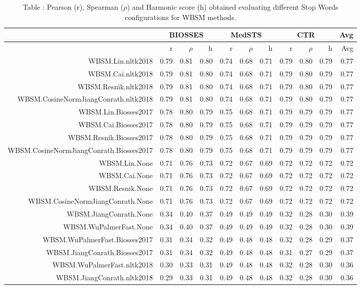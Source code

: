 \begin{table}[!h]
\centering
\caption{Table \label{table:Preprocessing_stopwords_WBSM}: Pearson (r), Spearman ($\rho$) and Harmonic score (h) obtained evaluating different Stop Words configurations for WBSM methods.} 
\begingroup\tiny
\begin{tabular}{rrrrrrrrrrr}
  \hline \multicolumn{1}{c}{ } & \multicolumn{3}{c}{BIOSSES} & \multicolumn{3}{c}{MedSTS} & \multicolumn{3}{c}{CTR} & \multicolumn{1}{c}{Avg} \\  \hline
 & r & $\rho$ & h & r & $\rho$ & h & r & $\rho$ & h & Avg \\ 
  \hline
WBSM.Lin.nltk2018 & 0.79 & 0.81 & 0.80 & 0.74 & 0.68 & 0.71 & 0.79 & 0.80 & 0.79 & 0.77 \\ 
  WBSM.Cai.nltk2018 & 0.79 & 0.81 & 0.80 & 0.74 & 0.68 & 0.71 & 0.79 & 0.80 & 0.79 & 0.77 \\ 
  WBSM.Resnik.nltk2018 & 0.79 & 0.81 & 0.80 & 0.74 & 0.68 & 0.71 & 0.79 & 0.80 & 0.79 & 0.77 \\ 
  WBSM.CosineNormJiangConrath.nltk2018 & 0.79 & 0.81 & 0.80 & 0.74 & 0.68 & 0.71 & 0.79 & 0.80 & 0.79 & 0.77 \\ 
  WBSM.Lin.Biosses2017 & 0.78 & 0.80 & 0.79 & 0.75 & 0.68 & 0.71 & 0.79 & 0.79 & 0.79 & 0.77 \\ 
  WBSM.Cai.Biosses2017 & 0.78 & 0.80 & 0.79 & 0.75 & 0.68 & 0.71 & 0.79 & 0.79 & 0.79 & 0.77 \\ 
  WBSM.Resnik.Biosses2017 & 0.78 & 0.80 & 0.79 & 0.75 & 0.68 & 0.71 & 0.79 & 0.79 & 0.79 & 0.77 \\ 
  WBSM.CosineNormJiangConrath.Biosses2017 & 0.78 & 0.80 & 0.79 & 0.75 & 0.68 & 0.71 & 0.79 & 0.79 & 0.79 & 0.77 \\ 
  WBSM.Lin.None & 0.71 & 0.76 & 0.73 & 0.72 & 0.67 & 0.69 & 0.72 & 0.72 & 0.72 & 0.72 \\ 
  WBSM.Cai.None & 0.71 & 0.76 & 0.73 & 0.72 & 0.67 & 0.69 & 0.72 & 0.72 & 0.72 & 0.72 \\ 
  WBSM.Resnik.None & 0.71 & 0.76 & 0.73 & 0.72 & 0.67 & 0.69 & 0.72 & 0.72 & 0.72 & 0.72 \\ 
  WBSM.CosineNormJiangConrath.None & 0.71 & 0.76 & 0.73 & 0.72 & 0.67 & 0.69 & 0.72 & 0.72 & 0.72 & 0.72 \\ 
  WBSM.JiangConrath.None & 0.34 & 0.40 & 0.37 & 0.49 & 0.49 & 0.49 & 0.32 & 0.28 & 0.30 & 0.39 \\ 
  WBSM.WuPalmerFast.None & 0.34 & 0.40 & 0.37 & 0.49 & 0.49 & 0.49 & 0.32 & 0.28 & 0.30 & 0.39 \\ 
  WBSM.WuPalmerFast.Biosses2017 & 0.31 & 0.34 & 0.32 & 0.49 & 0.48 & 0.48 & 0.32 & 0.28 & 0.29 & 0.37 \\ 
  WBSM.JiangConrath.Biosses2017 & 0.31 & 0.34 & 0.32 & 0.49 & 0.48 & 0.48 & 0.31 & 0.27 & 0.29 & 0.37 \\ 
  WBSM.WuPalmerFast.nltk2018 & 0.30 & 0.33 & 0.31 & 0.49 & 0.48 & 0.48 & 0.32 & 0.28 & 0.30 & 0.36 \\ 
  WBSM.JiangConrath.nltk2018 & 0.29 & 0.33 & 0.31 & 0.49 & 0.48 & 0.48 & 0.32 & 0.28 & 0.30 & 0.36 \\ 
   \hline
\end{tabular}
\endgroup
\end{table}

